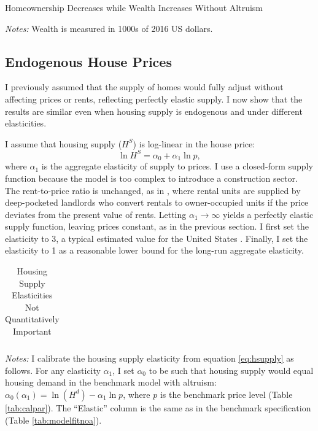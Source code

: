 \documentclass[12pt]{article}
\begin{document}
\begin{table}
	\center 
	\begin{threeparttable}
		\caption{Homeownership Decreases while Wealth Increases Without Altruism}\label{tab:modelfitnoa}
		
		\footnotesize
		\textit{Notes:} Wealth is measured in 1000s of 2016 US dollars.
	\end{threeparttable}
\end{table}

\subsection{Endogenous House Prices}\label{sec:endoprice}
I previously assumed that the supply of homes would fully adjust without affecting prices or rents, reflecting perfectly elastic supply. I now show that the results are similar even when housing supply is endogenous and under different elasticities.

I assume that housing supply ($H^S$) is log-linear in the house price:
\begin{equation}
\label{eq:hsupply}
\ln H^S = \alpha_0 + \alpha_1 \ln p,
\end{equation}
where $\alpha_1$ is the aggregate elasticity of supply to prices. I use a closed-form supply function because the model is too complex to introduce a construction sector. The rent-to-price ratio is unchanged, as in \cite{Kaplan2020}, where rental units are supplied by deep-pocketed landlords who convert rentals to owner-occupied units if the price deviates from the present value of rents. Letting $\alpha_1\to\infty$ yields a perfectly elastic supply function, leaving prices constant, as in the previous section. I first set the elasticity to 3, a typical estimated value for the United States \cite[see e.g.,][]{saiz2010geographic,aastveit2023changing}. Finally, I set the elasticity to 1 as a reasonable lower bound for the long-run aggregate elasticity.

\begin{table}
	\center 
	\begin{threeparttable}
		\caption{Housing Supply Elasticities Not Quantitatively Important}\label{tab:quant_endogenprices}
		
		\begin{tabular}{@{}llll@{}}
			
		\end{tabular}
		
		\footnotesize
				\textit{Notes:} I calibrate the housing supply elasticity from equation \eqref{eq:hsupply} as follows. For any elasticity $\alpha_1$, I set $\alpha_0$ to be such that housing supply would equal housing demand in the benchmark model with altruism: $\alpha_0(\alpha_1) = \ln(H^d) - \alpha_1 \ln p$, where $p$ is the benchmark price level (Table \ref{tab:calpar}). The ``Elastic'' column is the same as in the benchmark specification (Table \ref{tab:modelfitnoa}).
	\end{threeparttable}
\end{table}
\end{document}
